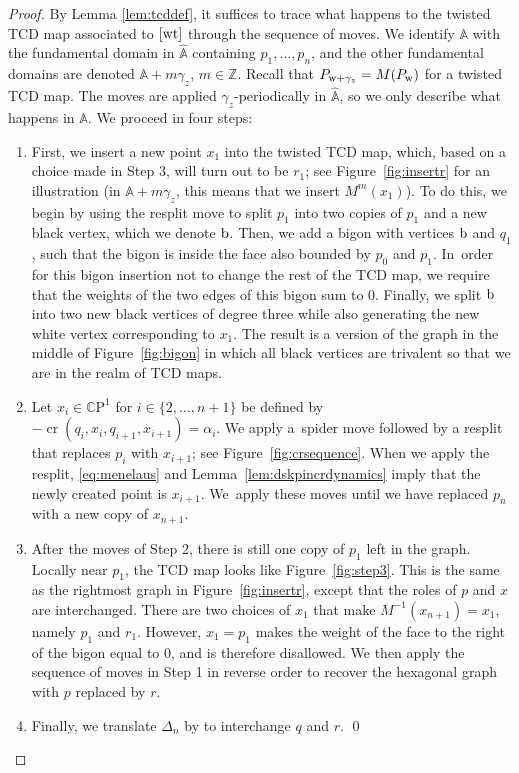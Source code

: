 \documentclass[pdftex]{sigma}
\numberwithin{equation}{section}
\newcommand{\Z}{{\mathbb Z}}
\newcommand{\CP}{{\mathbb C\mathrm P}}
\newcommand{\A}{{\mathbb A}}
\newcommand{\w}{{\rm w}}
\newcommand{\bw}{{\rm b}}
\newcommand{\wt}{{\rm wt}}
\def\cro{\operatorname{cr}}
\begin{document}
\begin{proof}
By Lemma \ref{lem:tcddef}, it suffices to trace what happens to the twisted TCD map associated to $[\wt]$ through the sequence of moves. We identify $\A$ with the fundamental domain in $\widehat \A$ containing $p_1,\dots,p_n$, and the other fundamental domains are denoted $\A+ m \gamma_z$, $m \in \Z$. Recall that $P_{\w+\gamma_z}=M(P_\w)$ for a twisted TCD map. The moves are applied $\gamma_z$-periodically in $\widehat \A$, so we only describe what happens in $\A$. We proceed in four steps:
\begin{enumerate}\itemsep=0pt
			\item %
First, we insert a new point $x_1$ into the twisted TCD map, which, based on a choice made in Step 3, will turn out to be $r_1$; see Figure~\ref{fig:insertr} for an illustration (in $\A + m \gamma_z$, this means that we insert $M^m(x_1)$). To do this, we begin by using the resplit move to split $p_1$ into two copies of $p_1$ and a new black vertex, which we denote $\bw$. Then, we add a bigon with vertices $\bw$ and $q_1$, such that the bigon is inside the face also bounded by $p_0$ and $p_1$. In~order for this bigon insertion not to change the rest of the TCD map, we require that the weights of the two edges of this bigon sum to $0$. Finally, we split $\bw$ into two new black vertices of degree three while also generating the new white vertex corresponding to $x_1$. The result is a version of the graph in the middle of Figure~\ref{fig:bigon} in which all black vertices are trivalent so that we are in the realm of TCD maps.
			\item %
Let $x_i \in \CP^1$ for $i \in \{2,\dots,n+1\}$ be defined by $-\cro(q_i,x_i,q_{i+1},x_{i+1})=\alpha_i$.
			We apply a~spider move followed by a resplit that replaces $p_i$ with $x_{i+1}$; see Figure~\ref{fig:crsequence}. When we apply the resplit, \eqref{eq:menelaus} and Lemma~\ref{lem:dskpincrdynamics} imply that the newly created point is $x_{i+1}$. We~apply these moves until we have replaced $p_n$ with a new copy of $x_{n+1}$.
			\item %
After the moves of Step 2,
there is still one copy of $p_1$ left in the graph. Locally near $p_1$, the TCD map looks like Figure~\ref{fig:step3}. This is the same as the rightmost graph in Figure~\ref{fig:insertr}, except that the roles of $p$ and $x$ are interchanged. There are two choices of $x_1$ that make $M^{-1} (x_{n+1})=x_1$, namely $p_1$ and $r_1$. However, $x_1=p_1$ makes the weight of the face to the right of the bigon equal to $0$, and is therefore disallowed. We then apply the sequence of moves in Step 1 in reverse order to recover the hexagonal graph with $p$ replaced by $r$. 		
			
			\item Finally, we translate $\Delta_n$ by  to interchange $q$ and $r$.
\hfill\qed
\end{enumerate}
\renewcommand{\qed}{}
\end{proof}
	
\end{document}
